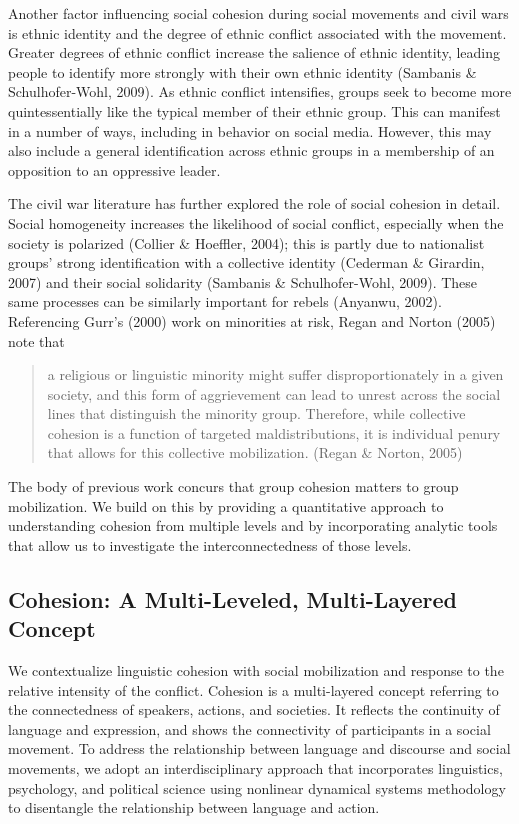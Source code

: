 \documentclass[english,man]{apa6}
\begin{document}
Another factor influencing social cohesion during social movements and civil
wars is ethnic identity and the degree of ethnic conflict associated with the
movement. Greater degrees of ethnic conflict increase the salience of ethnic
identity, leading people to identify more strongly with their own ethnic
identity (Sambanis \& Schulhofer-Wohl, 2009). As ethnic conflict intensifies, groups seek to become
more quintessentially like the typical member of their ethnic group. This can
manifest in a number of ways, including in behavior on social media. However,
this may also include a general identification across ethnic groups in a
membership of an opposition to an oppressive leader.

The civil war literature has further explored the role of social cohesion in
detail. Social homogeneity increases the likelihood of social conflict,
especially when the society is polarized (Collier \& Hoeffler, 2004); this is partly
due to nationalist groups' strong identification with a collective identity
(Cederman \& Girardin, 2007) and their social solidarity (Sambanis \& Schulhofer-Wohl, 2009). These
same processes can be similarly important for rebels (Anyanwu, 2002).
Referencing Gurr's (2000) work on minorities at
risk, Regan and Norton (2005) note that

\begin{quote}
a religious or linguistic minority
might suffer disproportionately in a given society, and this form of
aggrievement can lead to unrest across the social lines that distinguish the
minority group. Therefore, while collective cohesion is a function of targeted
maldistributions, it is individual penury that allows for this collective
mobilization. (Regan \& Norton, 2005)
\end{quote}

The body of previous work concurs that group cohesion matters to group
mobilization. We build on this by providing a quantitative approach to
understanding cohesion from multiple levels and by incorporating analytic tools
that allow us to investigate the interconnectedness of those levels.

\hypertarget{cohesion-a-multi-leveled-multi-layered-concept}{%
\subsection{Cohesion: A Multi-Leveled, Multi-Layered Concept}\label{cohesion-a-multi-leveled-multi-layered-concept}}

We contextualize linguistic cohesion with social mobilization and response to
the relative intensity of the conflict. Cohesion is a multi-layered concept
referring to the connectedness of speakers, actions, and societies. It
reflects the continuity of language and expression, and shows the
connectivity of participants in a social movement. To address the relationship
between language and discourse and social movements, we adopt an
interdisciplinary approach that incorporates linguistics, psychology, and
political science using nonlinear dynamical systems methodology to disentangle the
relationship between language and action.
\end{document}
